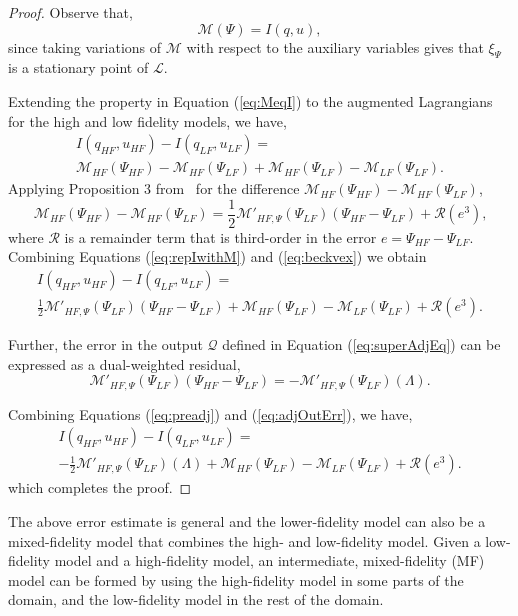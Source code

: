 %
\begin{proof}
%
Observe that,
%
\begin{equation}
\label{eq:MeqI}
\mathcal{M}(\Psi)=I(q,u),
\end{equation}
%
since taking variations of $\mathcal{M}$ with respect to the auxiliary variables gives that $\xi_\Psi$ is a stationary point of $\mathcal{L}$.

Extending the property in Equation (\ref{eq:MeqI}) to the augmented Lagrangians for the high and low fidelity models, we have,
%
\begin{multline}
\label{eq:repIwithM}
I(q_{HF},u_{HF})-I(q_{LF},u_{LF})=\\\mathcal{M}_{HF}(\Psi_{HF})-\mathcal{M}_{HF}(\Psi_{LF})+\mathcal{M}_{HF}(\Psi_{LF})-\mathcal{M}_{LF}(\Psi_{LF})\textrm{.}
\end{multline}
%
Applying Proposition 3 from~\cite{BecVex05} for the difference $\mathcal{M}_{HF}(\Psi_{HF})-\mathcal{M}_{HF}(\Psi_{LF})$,
\begin{equation}
\label{eq:beckvex}
\mathcal{M}_{HF}(\Psi_{HF})-\mathcal{M}_{HF}(\Psi_{LF}) = \frac{1}{2}\mathcal{M}'_{HF,\Psi}(\Psi_{LF})(\Psi_{HF}-\Psi_{LF})+\mathcal{R}(e^3)\textrm{,}
\end{equation}
where $\mathcal{R}$ is a remainder term that is third-order in the error $e=\Psi_{HF}-\Psi_{LF}$. Combining Equations (\ref{eq:repIwithM}) and (\ref{eq:beckvex}) we obtain
\begin{multline}
\label{eq:preadj}
I(q_{HF},u_{HF})-I(q_{LF},u_{LF})=\\\frac{1}{2}\mathcal{M}'_{HF,\Psi}(\Psi_{LF})(\Psi_{HF}-\Psi_{LF})+\mathcal{M}_{HF}(\Psi_{LF})-\mathcal{M}_{LF}(\Psi_{LF})+\mathcal{R}(e^3)\textrm{.}
\end{multline}

Further, the error in the output $\mathcal{Q}$ defined in Equation (\ref{eq:superAdjEq}) can be expressed as a dual-weighted residual,
\begin{equation}
\label{eq:adjOutErr}
\mathcal M'_{HF,\Psi}(\Psi_{LF})(\Psi_{HF}-\Psi_{LF})=-\mathcal{M}'_{HF,\Psi}(\Psi_{LF})(\Lambda).
\end{equation}

Combining Equations (\ref{eq:preadj}) and (\ref{eq:adjOutErr}), we have,
\begin{multline}
I(q_{HF},u_{HF})-I(q_{LF},u_{LF})=\\-\frac{1}{2}\mathcal{M}'_{HF,\Psi}(\Psi_{LF})(\Lambda)+\mathcal M_{HF}(\Psi_{LF})-\mathcal M_{LF}(\Psi_{LF})+\mathcal{R}(e^3). \nonumber
\end{multline}
%
which completes the proof.
\end{proof}
%
The above error estimate is general and the lower-fidelity model can also be a mixed-fidelity model that combines the high- and low-fidelity model. Given a low-fidelity model and a high-fidelity model, an intermediate, mixed-fidelity (MF) model can be formed by using the high-fidelity model in some parts of the domain, and the low-fidelity model in the rest of the domain.
